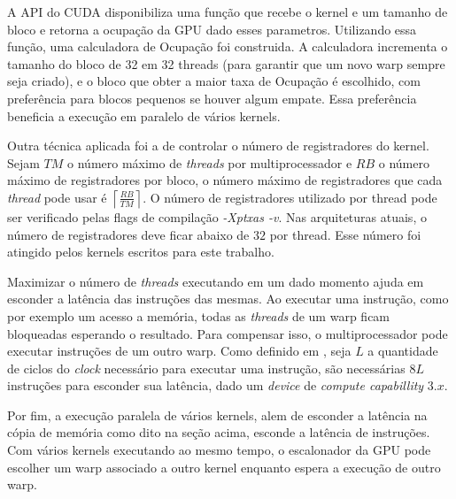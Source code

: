   A API do CUDA disponibiliza uma função que recebe o kernel e um tamanho de
bloco e retorna a ocupação da GPU dado esses parametros. Utilizando essa função,
uma calculadora de Ocupação foi construida. A calculadora incrementa o
tamanho do bloco de 32 em 32 threads (para garantir que um novo warp sempre
seja criado), e o bloco que obter a maior taxa de Ocupação é escolhido, com
preferência para blocos pequenos se houver algum empate. Essa preferência beneficia
a execução em paralelo de vários kernels.

  Outra técnica aplicada foi a de controlar o número de registradores do kernel.
Sejam $TM$ o número máximo de \textit{threads} por multiprocessador e $RB$ o
número máximo de registradores por bloco, o número máximo de registradores que
cada \textit{thread} pode usar é $\left \lceil{\frac{RB}{TM}}\right \rceil$.
O número de registradores utilizado por thread pode ser verificado pelas flags
de compilação \textit{-Xptxas -v}. Nas arquiteturas atuais, o número de
registradores deve ficar abaixo de $32$ por thread. Esse número foi atingido pelos
kernels escritos para este trabalho.

  Maximizar o número de \textit{threads} executando em um dado momento ajuda em
esconder a latência das instruções das mesmas. Ao executar uma instrução,
como por exemplo um acesso a memória, todas as \textit{threads} de um warp
ficam bloqueadas esperando o resultado. Para compensar isso, o multiprocessador
pode executar instruções de um outro warp. Como definido em \cite{cudaProgrammingGuide},
seja $L$ a quantidade de ciclos do \textit{clock} necessário para executar uma
instrução, são necessárias $8L$ instruções para esconder sua latência, dado um
\textit{device} de \textit{compute capabillity} $3.x$.

  Por fim, a execução paralela de vários kernels, alem de esconder a latência
na cópia de memória como dito na seção acima, esconde a latência de instruções.
Com vários kernels executando ao mesmo tempo, o escalonador da GPU pode escolher
um warp associado a outro kernel enquanto espera a execução de outro warp.
